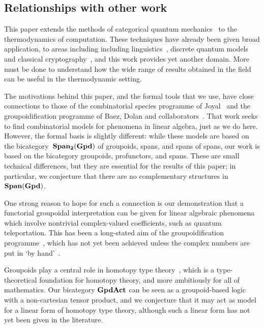 \documentclass[a4paper,12pt]{article}
\theoremstyle{definition}
\newcommand\cat[1]{{\ensuremath{\bf #1}}}
\renewcommand{\-}[0]{\nobreakdash-\hspace{0pt}}
\begin{document}
\subsection{Relationships with other work}
\label{sec:otherwork}

\noindent
This paper extends the methods of categorical quantum mechanics~\cite{ac04-csqp, ac08-cqm, cd11-iqo, sv13-bsnc, v12-hsqp} to the thermodynamics of computation. These techniques have already been given broad application, to areas including including linguistics~\cite{csc10-cdm}, discrete quantum models~\cite{ce08-tqc} and classical cryptography~\cite{sv13-bsnc}, and this work provides yet another domain.
More must be done to understand how the wide range of results obtained in the field can be useful in the thermodynamic setting.

The motivations behind this paper, and the formal tools that we use,  have close connections to those of the combinatorial species programme of Joyal~\cite{bicategoryspecies, joyalspecies} and the groupoidification programme of Baez, Dolan and collaborators~\cite{b08-hda7, bd01-fsfd, m06-caqm, m10-ct, mv13-cha1}. That work seeks to find combinatorial models for phenomena in linear algebra, just as we do here. However, the formal basis is slightly different: while these models are based on the bicategory~\cat{Span_2(Gpd)} of groupoids, spans, and spans of spans, our work is based on the bicategory  groupoids, profunctors, and spans. These are small technical differences, but they are essential for the results of this paper; in particular, we conjecture that there are no complementary structures in \cat{Span(Gpd)}.

One strong reason to hope for such a connection is our demonstration that a functorial groupoidal interpretation  can be given for linear algebraic phenomena which involve nontrivial complex-valued coefficients, such as quantum teleportation. This has been  a long-stated aim of the groupoidification programme~\cite[Section~1]{b08-hda7}, which has not yet been achieved unless the complex numbers are put in `by hand'~\cite{m06-caqm}.

Groupoids play a central role in homotopy type theory~\cite{hofmannstreicher, htt}, which is a type-theoretical foundation for homotopy theory, and more ambitiously for all of mathematics. Our bicategory \cat{GpdAct} can be seen as a groupoid-based logic with a non-cartesian tensor product, and we conjecture that it may act as model for a linear form of homotopy type theory, although such a linear form has not yet been given in the literature.
\end{document}
